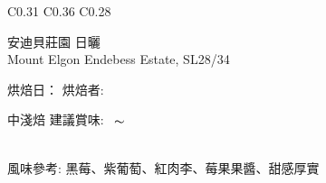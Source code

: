 \documentclass[10pt,a4paper]{article}
\begin{document}
\begin{tabular}{C{0.31\textwidth} C{0.36\textwidth} C{0.28\textwidth}}
{{\Large \hspace*{0.1em} \vspace*{0.15cm}  
\hspace*{0.7em}安迪貝莊園 \large 日曬%
}\vspace*{0.15em}\\
{\small
Mount Elgon Endebess Estate,   SL28/34 %
}\vspace*{0.35em}\\
\setdatetoday \addtocounter{datenumber}{
-1%
}\setdatebynumber{\thedatenumber}
{\scriptsize 烘焙日：{\scriptsize\datedate}\hspace{0.3em}%
烘焙者: \textbf{\scriptsize{}}}\vspace*{-0.3em}\\
 \addtocounter{datenumber}{
5 }%
\setdatebynumber{\thedatenumber} 
{\normalsize 
中淺焙%
\enskip \scriptsize 建議賞味:} \scriptsize{\datemonthname ~\thedateday}$\thicksim$\addtocounter{datenumber}{55}\setdatebynumber{\thedatenumber} \datedate
\\\scriptsize 風味參考: 黑莓、紫葡萄、紅肉李、莓果果醬、甜感厚實
}
\end{tabular}
\end{document}
